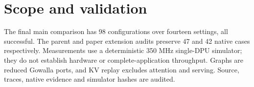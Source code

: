 \documentclass[conference,onecolumn]{IEEEtran}
\begin{document}
\section{Scope and validation}
The final main comparison has 98 configurations over fourteen settings, all successful. The parent and paper extension audits preserve 47 and 42 native cases respectively. Measurements use a deterministic 350 MHz single-DPU simulator; they do not establish hardware or complete-application throughput. Graphs are reduced Gowalla ports, and KV replay excludes attention and serving. Source, traces, native evidence and simulator hashes are audited.
\end{document}
